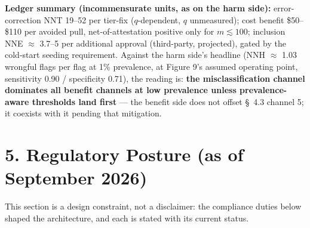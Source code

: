 \documentclass[
]{article}
\begin{document}
\textbf{Ledger summary (incommensurate units, as on the harm side):}
error-correction NNT 19--52 per tier-fix (\(q\)-dependent, \(q\)
unmeasured); cost benefit \$50--\$110 per avoided pull,
net-of-attestation positive only for \(m \lesssim 100\); inclusion NNE
\(\approx\) 3.7--5 per additional approval (third-party, projected),
gated by the cold-start seeding requirement. Against the harm side's
headline (NNH \(\approx\) 1.03 wrongful flags per flag at 1\%
prevalence, at Figure 9's assumed operating point, sensitivity 0.90 /
specificity 0.71), the reading is: \textbf{the misclassification channel
dominates all benefit channels at low prevalence unless prevalence-aware
thresholds land first} --- the benefit side does not offset §~4.3
channel 5; it coexists with it pending that mitigation.

\section{5. Regulatory Posture (as of September
2026)}\label{regulatory-posture-as-of-september-2026}

This section is a design constraint, not a disclaimer: the compliance
duties below shaped the architecture, and each is stated with its
current status.
\end{document}
